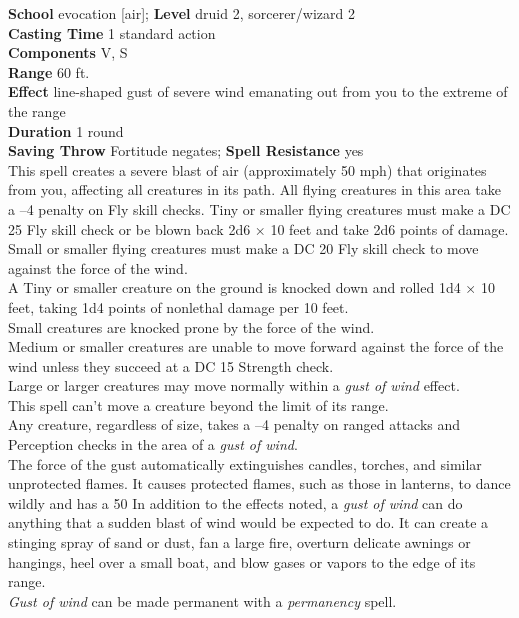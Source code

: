 \textbf{School} evocation [air]; \textbf{Level} druid 2, sorcerer/wizard 2\\
\textbf{Casting Time} 1 standard action\\
\textbf{Components} V, S\\
\textbf{Range} 60 ft.\\
\textbf{Effect} line-shaped gust of severe wind emanating out from you to the extreme of the range\\
\textbf{Duration} 1 round\\
\textbf{Saving Throw} Fortitude negates; \textbf{Spell Resistance} yes\\
This spell creates a severe blast of air (approximately 50 mph) that originates from you, affecting all creatures in its path. All flying creatures in this area take a –4 penalty on Fly skill checks. Tiny or smaller flying creatures must make a DC 25 Fly skill check or be blown back 2d6 × 10 feet and take 2d6 points of damage. Small or smaller flying creatures must make a DC 20 Fly skill check to move against the force of the wind.\\
A Tiny or smaller creature on the ground is knocked down and rolled 1d4 × 10 feet, taking 1d4 points of nonlethal damage per 10 feet.\\
Small creatures are knocked prone by the force of the wind.\\
Medium or smaller creatures are unable to move forward against the force of the wind unless they succeed at a DC 15 Strength check.\\
Large or larger creatures may move normally within a \textit{gust of wind }effect.\\
This spell can't move a creature beyond the limit of its range.\\
Any creature, regardless of size, takes a –4 penalty on ranged attacks and Perception checks in the area of a \textit{gust of wind}.\\
The force of the gust automatically extinguishes candles, torches, and similar unprotected flames. It causes protected flames, such as those in lanterns, to dance wildly and has a 50%
In addition to the effects noted, a \textit{gust of wind }can do anything that a sudden blast of wind would be expected to do. It can create a stinging spray of sand or dust, fan a large fire, overturn delicate awnings or hangings, heel over a small boat, and blow gases or vapors to the edge of its range.\\
\textit{Gust of wind }can be made permanent with a \textit{permanency }spell.\\
